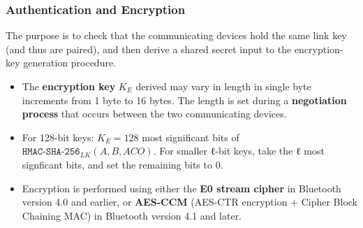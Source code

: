 \documentclass[12pt,titlepage]{article}
\begin{document}
\subsubsection{Authentication and Encryption}
The purpose is to check that the communicating devices hold the same link key (and thus are paired), and then derive a shared secret input to the encryption-key generation procedure.

\begin{itemize}
	\item The \textbf{encryption key} $K_E$ derived may vary in length in single byte increments from 1 byte to 16 bytes. The length is set during a \textbf{negotiation process} that occurs between the two communicating devices.
	\item For 128-bit keys: $K_E = 128$ most significant bits of $\texttt{HMAC-SHA-256}_{LK} (A, B, ACO)$. For smaller ℓ-bit keys, take the ℓ most signficant bits, and set the remaining bits to 0.
	\item Encryption is performed using either the \textbf{E0 stream cipher} in Bluetooth version 4.0 and earlier, or \textbf{AES-CCM} (AES-CTR encryption + Cipher Block Chaining MAC) in Bluetooth version 4.1 and later.
\end{itemize}
\end{document}

